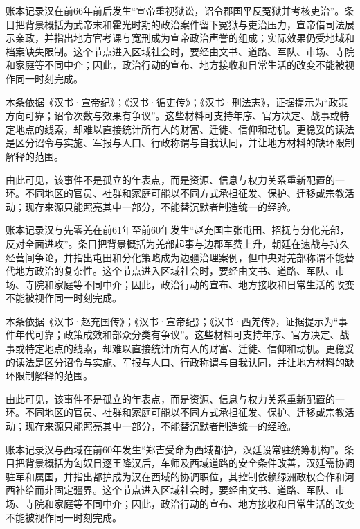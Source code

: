 账本记录汉在前66年前后发生“宣帝重视狱讼，诏令郡国平反冤狱并考核吏治”。条目把背景概括为武帝末和霍光时期的政治案件留下冤狱与吏治压力，宣帝借司法展示亲政，并指出地方官考课与宽刑成为宣帝政治声誉的组成；实际效果仍受地域和档案缺失限制。这个节点进入区域社会时，要经由文书、道路、军队、市场、寺院和家庭等不同中介；因此，政治行动的宣布、地方接收和日常生活的改变不能被视作同一时刻完成。

本条依据《汉书·宣帝纪》；《汉书·循吏传》；《汉书·刑法志》，证据提示为“政策方向可靠；诏令次数与效果有争议”。这些材料可支持年序、官方决定、战事或特定地点的线索，却难以直接统计所有人的财富、迁徙、信仰和动机。更稳妥的读法是区分诏令与实施、军报与人口、行政称谓与自我认同，并让地方材料的缺环限制解释的范围。

由此可见，该事件不是孤立的年表点，而是资源、信息与权力关系重新配置的一环。不同地区的官员、社群和家庭可能以不同方式承担征发、保护、迁移或宗教活动；现存来源只能照亮其中一部分，不能替沉默者制造统一的经验。

账本记录汉与先零羌在前61年至前60年发生“赵充国主张屯田、招抚与分化羌部，反对全面进攻”。条目把背景概括为羌部起事与边郡军费上升，朝廷在速战与持久经营间争论，并指出屯田和分化策略成为边疆治理案例，但中央对羌部称谓不能替代地方政治的复杂性。这个节点进入区域社会时，要经由文书、道路、军队、市场、寺院和家庭等不同中介；因此，政治行动的宣布、地方接收和日常生活的改变不能被视作同一时刻完成。

本条依据《汉书·赵充国传》；《汉书·宣帝纪》；《汉书·西羌传》，证据提示为“事件年代可靠；政策成效和部众分类有争议”。这些材料可支持年序、官方决定、战事或特定地点的线索，却难以直接统计所有人的财富、迁徙、信仰和动机。更稳妥的读法是区分诏令与实施、军报与人口、行政称谓与自我认同，并让地方材料的缺环限制解释的范围。

由此可见，该事件不是孤立的年表点，而是资源、信息与权力关系重新配置的一环。不同地区的官员、社群和家庭可能以不同方式承担征发、保护、迁移或宗教活动；现存来源只能照亮其中一部分，不能替沉默者制造统一的经验。

账本记录汉与西域在前60年发生“郑吉受命为西域都护，汉廷设常驻统筹机构”。条目把背景概括为匈奴日逐王降汉后，车师及西域道路的安全条件改善，汉廷需协调驻军和属国，并指出都护成为汉在西域的协调职位，其控制依赖绿洲政权合作和河西补给而非固定疆界。这个节点进入区域社会时，要经由文书、道路、军队、市场、寺院和家庭等不同中介；因此，政治行动的宣布、地方接收和日常生活的改变不能被视作同一时刻完成。

